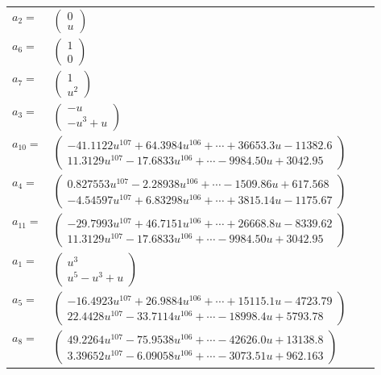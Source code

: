 \documentclass[1p]{elsarticle_modified}
\theoremstyle{definition}
\begin{document}
\begin{tabular}{m{7pt} m{180pt} m{7pt} m{180pt} }
\flushright $a_{2}=$&$\begin{pmatrix}0\\u\end{pmatrix}$ \\
\flushright $a_{6}=$&$\begin{pmatrix}1\\0\end{pmatrix}$ \\
\flushright $a_{7}=$&$\begin{pmatrix}1\\u^2\end{pmatrix}$ \\
\flushright $a_{3}=$&$\begin{pmatrix}- u\\- u^3+u\end{pmatrix}$ \\
\flushright $a_{10}=$&$\begin{pmatrix}-41.1122 u^{107}+64.3984 u^{106}+\cdots+36653.3 u-11382.6\\11.3129 u^{107}-17.6833 u^{106}+\cdots-9984.50 u+3042.95\end{pmatrix}$ \\
\flushright $a_{4}=$&$\begin{pmatrix}0.827553 u^{107}-2.28938 u^{106}+\cdots-1509.86 u+617.568\\-4.54597 u^{107}+6.83298 u^{106}+\cdots+3815.14 u-1175.67\end{pmatrix}$ \\
\flushright $a_{11}=$&$\begin{pmatrix}-29.7993 u^{107}+46.7151 u^{106}+\cdots+26668.8 u-8339.62\\11.3129 u^{107}-17.6833 u^{106}+\cdots-9984.50 u+3042.95\end{pmatrix}$ \\
\flushright $a_{1}=$&$\begin{pmatrix}u^3\\u^5- u^3+u\end{pmatrix}$ \\
\flushright $a_{5}=$&$\begin{pmatrix}-16.4923 u^{107}+26.9884 u^{106}+\cdots+15115.1 u-4723.79\\22.4428 u^{107}-33.7114 u^{106}+\cdots-18998.4 u+5793.78\end{pmatrix}$ \\
\flushright $a_{8}=$&$\begin{pmatrix}49.2264 u^{107}-75.9538 u^{106}+\cdots-42626.0 u+13138.8\\3.39652 u^{107}-6.09058 u^{106}+\cdots-3073.51 u+962.163\end{pmatrix}$ \\

\end{tabular}
\end{document}
